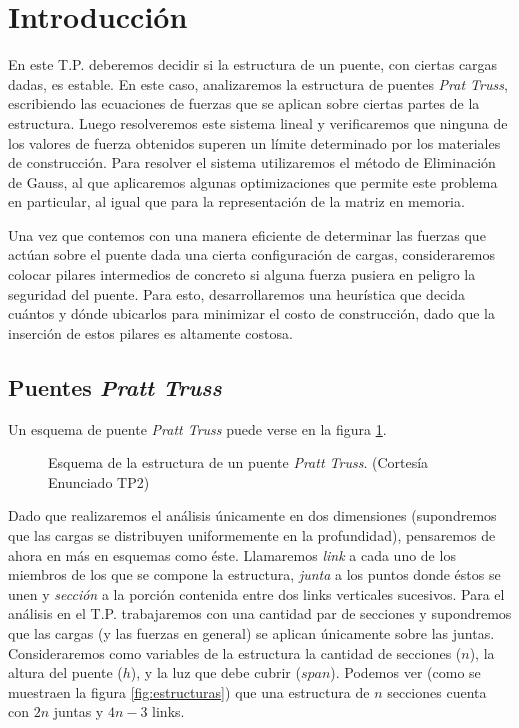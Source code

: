 \section{Introducción}
En este T.P. deberemos decidir si la estructura de un puente, con ciertas cargas dadas, es estable. En este caso, analizaremos la estructura de puentes \emph{Prat Truss}, escribiendo las ecuaciones de fuerzas que se aplican sobre ciertas partes de la estructura. Luego resolveremos este sistema lineal y verificaremos que ninguna de los valores de fuerza obtenidos superen un límite determinado por los materiales de construcción. Para resolver el sistema utilizaremos el método de Eliminación de Gauss, al que aplicaremos algunas optimizaciones que permite este problema en particular, al igual que para la representación de la matriz en memoria. 

Una vez que contemos con una manera eficiente de determinar las fuerzas que actúan sobre el puente dada una cierta configuración de cargas, consideraremos colocar pilares intermedios de concreto si alguna fuerza pusiera en peligro la seguridad del puente. Para esto, desarrollaremos una heurística que decida cuántos y dónde ubicarlos para minimizar el costo de construcción, dado que la inserción de estos pilares es altamente costosa.

\subsection{Puentes \emph{Pratt Truss}}
Un esquema de puente \emph{Pratt Truss} puede verse en la figura \ref{fig:puente}.
\begin{figure}[!ht]
\begin{center}

\caption{Esquema de la estructura de un puente \emph{Pratt Truss}. \small{(Cortesía Enunciado TP2)}}
\label{fig:puente}
\end{center}
\end{figure}

Dado que realizaremos el análisis únicamente en dos dimensiones (supondremos que las cargas se distribuyen uniformemente en la profundidad), pensaremos de ahora en más en esquemas como éste. Llamaremos \emph{link} a cada uno de los miembros de los que se compone la estructura, \emph{junta} a los puntos donde éstos se unen y \emph{sección} a la porción contenida entre dos links verticales sucesivos. Para el análisis en el T.P. trabajaremos con una cantidad par de secciones y supondremos que las cargas (y las fuerzas en general) se aplican únicamente sobre las juntas. Consideraremos como variables de la estructura la cantidad de secciones ($n$), la altura del puente ($h$), y la luz que debe cubrir ($span$). Podemos ver (como se muestraen la figura \ref{fig:estructuras}) que una estructura de $n$ secciones cuenta con $2n$ juntas y $4n-3$ links.

